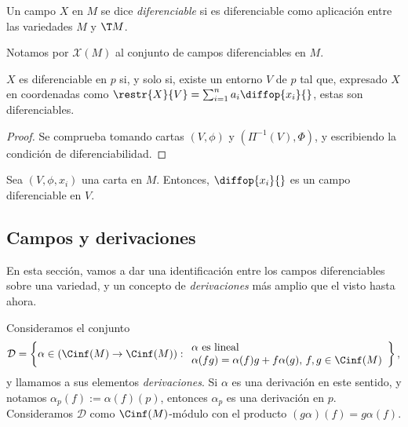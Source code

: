 \begin{ndef}
  Un campo $X$ en $M$ se dice \emph{diferenciable} si es diferenciable como
  aplicación entre las variedades $M$ y $\T M$.
\end{ndef}

Notamos por $\mathscr{X}(M)$ al conjunto de campos diferenciables en $M$.

\begin{nprop}
  $X$ es diferenciable en $p$ si, y solo si, existe un entorno $V$ de $p$ tal
  que, expresado $X$ en coordenadas como $\restr{X}{V} =
  \sum_{i=1}^{n}a_{i}\diffop{x_{i}}{}$, estas son diferenciables.
\end{nprop}
\begin{proof}
  Se comprueba tomando cartas $(V,\phi)$ y $(\Pi^{-1}(V), \Phi)$, y escribiendo
  la condición de diferenciabilidad.
\end{proof}

\begin{ejemplo}
  Sea $(V,\phi,x_{i})$ una carta en $M$. Entonces, $\diffop{x_{i}}{}$ es un campo
  diferenciable en $V$.
\end{ejemplo}

\subsection{Campos y derivaciones}

En esta sección, vamos a dar una identificación entre los campos diferenciables
sobre una variedad, y un concepto de \emph{derivaciones} más amplio que el visto
hasta ahora.

Consideramos el conjunto
\[
  \mathcal{D} = \left\{ \alpha\in (\Cinf(M)\to\Cinf(M)) :
    \begin{array}{l}
      \alpha\text{ es lineal} \\
      \alpha(fg) = \alpha(f)g + f\alpha(g),\, f,g\in\Cinf(M)
    \end{array}
\right\},
\]
y llamamos a sus elementos \emph{derivaciones}. Si $\alpha$ es una derivación en
este sentido, y notamos $\alpha_{p}(f) := \alpha(f)(p)$, entonces $\alpha_{p}$
es una derivación en $p$. Consideramos $\mathcal{D}$ como $\Cinf(M)$-módulo con
el producto $(g\alpha)(f) = g\alpha(f)$.

